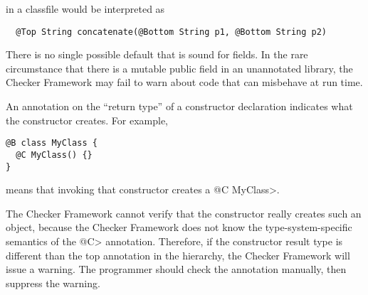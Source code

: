 \noindent
in a classfile would be interpreted as

\begin{Verbatim}
  @Top String concatenate(@Bottom String p1, @Bottom String p2)
\end{Verbatim}

There is no single possible default that is sound for fields.  In the rare
circumstance that there is a mutable public field in an unannotated
library, the Checker Framework may fail to warn about code that can
misbehave at run time.







An annotation on the ``return type'' of a constructor declaration indicates
what the constructor creates.  For example,

\begin{Verbatim}
@B class MyClass {
  @C MyClass() {}
}
\end{Verbatim}

\noindent
means that invoking that constructor creates a \<@C MyClass>.

The Checker Framework cannot verify that the constructor really creates
such an object, because the Checker Framework does not know the
type-system-specific semantics of the \<@C> annotation.
Therefore, if the constructor result type is different than the top annotation in the
hierarchy, the Checker Framework will issue a warning.
The programmer should check the annotation manually, then
suppress the warning.



